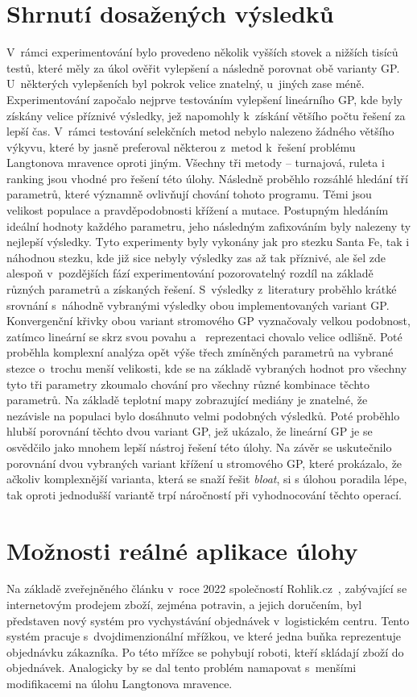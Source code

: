 \section{Shrnutí dosažených výsledků}
V~rámci experimentování bylo provedeno několik vyšších stovek a nižších tisíců testů, které měly za úkol ověřit vylepšení a následně porovnat obě varianty GP. U~některých vylepšeních byl pokrok velice znatelný, u~jiných zase méně.
Experimentování započalo nejprve testováním vylepšení lineárního GP, kde byly získány velice příznivé výsledky, jež napomohly k~získání většího počtu řešení za lepší čas.
V~rámci testování selekčních metod nebylo nalezeno žádného většího výkyvu, které by jasně preferoval některou z~metod k~řešení problému Langtonova mravence oproti jiným. Všechny tři metody -- turnajová, ruleta i ranking jsou vhodné pro řešení této úlohy.
Následně proběhlo rozsáhlé hledání tří parametrů, které významně ovlivňují chování tohoto programu. Těmi jsou velikost populace a pravděpodobnosti křížení a mutace. Postupným hledáním ideální hodnoty každého parametru, jeho následným zafixováním byly nalezeny ty nejlepší výsledky. Tyto experimenty byly vykonány jak pro stezku Santa Fe, tak i náhodnou stezku, kde již sice nebyly výsledky zas až tak příznivé, ale šel zde alespoň v~pozdějších fází experimentování pozorovatelný rozdíl na základě různých parametrů a získaných řešení.
S~výsledky z~literatury proběhlo krátké srovnání s~náhodně vybranými výsledky obou implementovaných variant GP. Konvergenční křivky obou variant stromového GP vyznačovaly velkou podobnost, zatímco lineární se skrz svou povahu a~ reprezentaci chovalo velice odlišně.
Poté proběhla komplexní analýza opět výše třech zmíněných parametrů na vybrané stezce o~trochu menší velikosti, kde se na základě vybraných hodnot pro všechny tyto tři parametry zkoumalo chování pro všechny různé kombinace těchto parametrů. Na základě teplotní mapy zobrazující mediány je znatelné, že nezávisle na populaci bylo dosáhnuto velmi podobných výsledků. Poté proběhlo hlubší porovnání těchto dvou variant GP, jež ukázalo, že lineární GP je se osvědčilo jako mnohem lepší nástroj řešení této úlohy. Na závěr se uskutečnilo porovnání dvou vybraných variant křížení u stromového GP, které prokázalo, že ačkoliv komplexnější varianta, která se snaží řešit \emph{bloat}, si s úlohou poradila lépe, tak oproti jednodušší variantě trpí náročností při vyhodnocování těchto operací.

\section{Možnosti reálné aplikace úlohy}
Na základě zveřejněného článku v~roce 2022 společností Rohlik.cz~\cite{rohlik}, zabývající se internetovým prodejem zboží, zejména potravin, a jejich doručením, byl představen nový systém pro vychystávání objednávek v~logistickém centru. Tento systém pracuje s~dvojdimenzionální mřížkou, ve které jedna buňka reprezentuje objednávku zákazníka. Po této mřížce se pohybují roboti, kteří skládají zboží do objednávek. Analogicky by se dal tento problém namapovat s~menšími modifikacemi na úlohu Langtonova mravence. 

